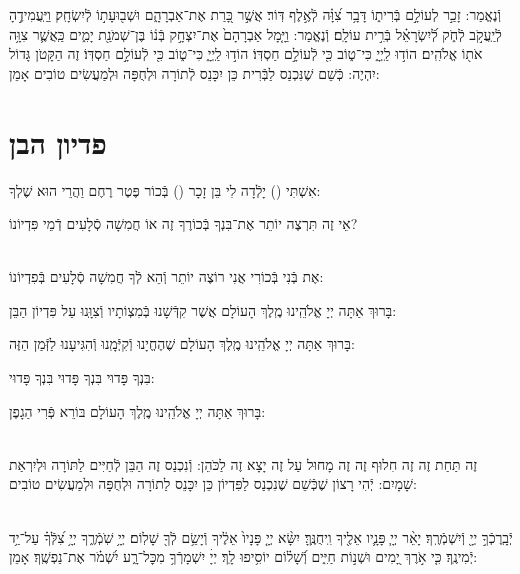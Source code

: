 \documentclass[twoside, openany, parskip=half, 11pt]{book}
\begin{document}

וְֿנֶאֱמַר: זָכַ֣ר לְעוֹלָ֣ם בְּֿרִית֑וֹ דָּבָ֥ר צִ֝וָּ֗ה לְֿאֶ֣לֶף דּֽוֹר׃ אֲשֶׁ֣ר כָּ֭רַת אֶת־אַבְרָהָ֑ם
וּשְׁב֖וּעָת֣וֹ לְֿיִשְׂחָֽק׃ וַיַּֽעֲמִידֶ֣הָ לְֿיַֽעֲקֹ֣ב לְֿחֹ֑ק לְֿ֝יִשְׂרָאֵ֗ל בְּֿרִ֣ית עוֹלָֽם׃
וְֿנֶאֱמַר: וַיָּ֤מָל אַבְרָהָם֙ אֶת־יִצְחָ֣ק בְּֿנ֔וֹ בֶּן־שְׁמֹנַ֖ת יָמִ֑ים כַּֽאֲשֶׁ֛ר צִוָּ֥ה אֹת֖וֹ אֱלֹהִֽים׃ הוֹד֣וּ לַֽיְיָ֑ כִּי־ט֑וֹב כִּ֖י לְֿעוֹלָ֣ם חַסְדּֽוֹ׃
הוֹד֣וּ לַֽיְיָ֑ כִּי־ט֑וֹב כִּ֖י לְֿעוֹלָ֣ם חַסְדּֽוֹ׃
 זֶה הַקָּטֹן גָּדוֹל יִהְיֶה:
כְּֿשֵׁם שֶׁנִּכְנַס לַבְּֿרִית כֵּן יִכָּנֵס לְֿתוֹרָה וּלְחֻפָּה וּלְמַעֲשִׂים טוֹבִים אָמֵן:

\vfill
\sepline

\chapter[פדיון הבן]{ פדיון הבן }


אִשְׁתִּי () יָלְֿדָה לִי בֵּן זָכָר () בְּֿכוֹר פֶּטֶר רֶחֶם וַהֲרֵי הוּא שֶׁלְךָ:

אֵי זֶה תִּרְצֶה יוֹתֵר אֶת־בִּנְךָ בְּֿכוֹרֶךָ זֶה אוֹ חֲמִשָׁה סְֿלָעִים דְֿמֵי פִּדְיוֹנוֹ?

\\
אֶת בְּֿנִי בְּֿכוֹרִי אֲנִי רוֹצֶה יוֹתֵר וְֿהֵא לְֿךָ חֲמִשָׁה סְֿלָעִים בְּֿפִדְיוֹנוֹ:

בָּרוּךְ אַתָּה יְיָ אֱלֹהֵֽינוּ מֶֽלֶךְ הָעוֹלָם אֲשֶׁר קִדְּֿשָׁנוּ בְּֿמִצְוֹתָיו וְֿצִוָּֽנוּ עַל פִּדְיוֹן הַבֵּן:

בָּרוּךְ אַתָּה יְיָ אֱלֹהֵֽינוּ מֶֽלֶךְ הָעוֹלָם שֶׁהֶחֱיָנוּ וְֿקִיְּֿמָֽנוּ וְֿהִגִּיעָנוּ לַזְּֿמַן הַזֶּה:


בִּנְךָ פָּדוּי בִּנְךָ פָּדוּי בִּנְךָ פָּדוּי:

בָּרוּךְ אַתָּה יְיָ אֱלֹהֵֽינוּ מֶֽלֶךְ הָעוֹלָם בּוֹרֵא פְּֿרִי הַגָפֶן:

 \\
זֶה תַּחַת זֶה זֶה חִלוּף זֶה זֶה מָחוּל עַל זֶה יָצָא זֶה לַכֹּהֵן:
וְֿנִכְנַס זֶה הַבֵּן לְֿחַיִּים לַתּוֹרָה וּלְיִרְאַת שָׁמָיִם:
יְֿהִי רָצוֹן שֶׁכְּֿשֵׁם שֶׁנִכְנַס לַפִּדְיוֹן כֵּן יִכָּנֵס לַתוֹרָה וּלְחֻפָּה וּלְמַעֲשִׂים טוֹבִים:

\\
יְֿבָֽרֶכְֿךָ֣ יְיָ֖ וְֿיִשְׁמְֿרֶֽךָ׃ יָאֵ֨ר יְיָ֧ פָּנָ֛יו אֵלֶ֖יךָ וִֽיחֻנֶּֽךָּ׃ יִשָּׂ֨א יְיָ֤ פָּנָיו֙ אֵלֶ֔יךָ וְֿיָשֵׂ֥ם לְֿךָ֖ שָׁלֽוֹם׃
יְיָ֥ שֹֽׁמְֿרֶ֑ךָ יְיָ֥ צִ֝לְּֿךָ֗ עַל־יַ֥ד יְֿמִינֶֽךָ׃
כִּ֤י אֹ֣רֶךְ יָ֭מִים וּשְׁנ֣וֹת חַיִּ֑ים וְֿ֝שָׁל֗וֹם יוֹסִ֥יפוּ לָֽךְ׃
יְיָׄ יִשְׁמָרְֿךָ֥ מִכׇּל־רָ֑ע יִ֝שְׁמֹ֗ר אֶת־נַפְשֶֽׁךָ׃ אָמֵן:
\end{document}
